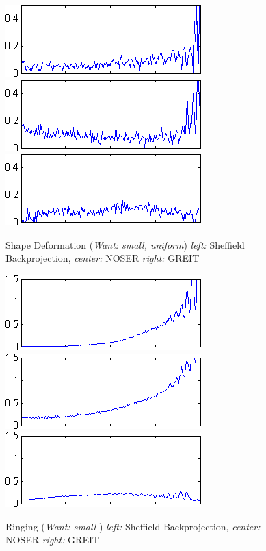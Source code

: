 \documentclass[12pt]{iopart}
\begin{document}
\begin{figure}[bhtp, bb=0 0 280 110]
\begin{center}
  \includegraphics[width= 0.3 \textwidth, bb=0 0 280 110]
{../../tutorial/GREIT-evaluation/simulation_test_imgs/simulation_test04_15.png}
  \includegraphics[width= 0.3 \textwidth, bb=0 0 280 110]
{../../tutorial/GREIT-evaluation/simulation_test_imgs/simulation_test04_25.png}
  \includegraphics[width= 0.3 \textwidth, bb=0 0 280 110]
{../../tutorial/GREIT-evaluation/simulation_test_imgs/simulation_test04_45.png}
\caption{ \label{fig:rimage}
Shape Deformation ({\em Want: small, uniform})
{\em left:} Sheffield Backprojection,
{\em center:} NOSER
{\em right:} GREIT
}
\end{center}
\end{figure}

\begin{figure}[bhtp, bb=0 0 280 110]
\begin{center}
  \includegraphics[width= 0.3 \textwidth, bb=0 0 280 110]
{../../tutorial/GREIT-evaluation/simulation_test_imgs/simulation_test04_16.png}
  \includegraphics[width= 0.3 \textwidth, bb=0 0 280 110]
{../../tutorial/GREIT-evaluation/simulation_test_imgs/simulation_test04_26.png}
  \includegraphics[width= 0.3 \textwidth, bb=0 0 280 110]
{../../tutorial/GREIT-evaluation/simulation_test_imgs/simulation_test04_46.png}
\caption{ \label{fig:rimage}
Ringing ({\em Want: small })
{\em left:} Sheffield Backprojection,
{\em center:} NOSER
{\em right:} GREIT
}
\end{center}
\end{figure}
\end{document}
